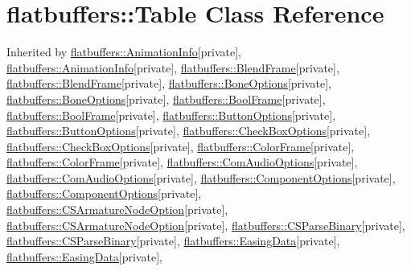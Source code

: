 \hypertarget{classflatbuffers_1_1Table}{}\section{flatbuffers\+:\+:Table Class Reference}
\label{classflatbuffers_1_1Table}


Inherited by \hyperlink{structflatbuffers_1_1AnimationInfo}{flatbuffers\+::\+Animation\+Info}{\ttfamily  \mbox{[}private\mbox{]}}, \hyperlink{structflatbuffers_1_1AnimationInfo}{flatbuffers\+::\+Animation\+Info}{\ttfamily  \mbox{[}private\mbox{]}}, \hyperlink{structflatbuffers_1_1BlendFrame}{flatbuffers\+::\+Blend\+Frame}{\ttfamily  \mbox{[}private\mbox{]}}, \hyperlink{structflatbuffers_1_1BlendFrame}{flatbuffers\+::\+Blend\+Frame}{\ttfamily  \mbox{[}private\mbox{]}}, \hyperlink{structflatbuffers_1_1BoneOptions}{flatbuffers\+::\+Bone\+Options}{\ttfamily  \mbox{[}private\mbox{]}}, \hyperlink{structflatbuffers_1_1BoneOptions}{flatbuffers\+::\+Bone\+Options}{\ttfamily  \mbox{[}private\mbox{]}}, \hyperlink{structflatbuffers_1_1BoolFrame}{flatbuffers\+::\+Bool\+Frame}{\ttfamily  \mbox{[}private\mbox{]}}, \hyperlink{structflatbuffers_1_1BoolFrame}{flatbuffers\+::\+Bool\+Frame}{\ttfamily  \mbox{[}private\mbox{]}}, \hyperlink{structflatbuffers_1_1ButtonOptions}{flatbuffers\+::\+Button\+Options}{\ttfamily  \mbox{[}private\mbox{]}}, \hyperlink{structflatbuffers_1_1ButtonOptions}{flatbuffers\+::\+Button\+Options}{\ttfamily  \mbox{[}private\mbox{]}}, \hyperlink{structflatbuffers_1_1CheckBoxOptions}{flatbuffers\+::\+Check\+Box\+Options}{\ttfamily  \mbox{[}private\mbox{]}}, \hyperlink{structflatbuffers_1_1CheckBoxOptions}{flatbuffers\+::\+Check\+Box\+Options}{\ttfamily  \mbox{[}private\mbox{]}}, \hyperlink{structflatbuffers_1_1ColorFrame}{flatbuffers\+::\+Color\+Frame}{\ttfamily  \mbox{[}private\mbox{]}}, \hyperlink{structflatbuffers_1_1ColorFrame}{flatbuffers\+::\+Color\+Frame}{\ttfamily  \mbox{[}private\mbox{]}}, \hyperlink{structflatbuffers_1_1ComAudioOptions}{flatbuffers\+::\+Com\+Audio\+Options}{\ttfamily  \mbox{[}private\mbox{]}}, \hyperlink{structflatbuffers_1_1ComAudioOptions}{flatbuffers\+::\+Com\+Audio\+Options}{\ttfamily  \mbox{[}private\mbox{]}}, \hyperlink{structflatbuffers_1_1ComponentOptions}{flatbuffers\+::\+Component\+Options}{\ttfamily  \mbox{[}private\mbox{]}}, \hyperlink{structflatbuffers_1_1ComponentOptions}{flatbuffers\+::\+Component\+Options}{\ttfamily  \mbox{[}private\mbox{]}}, \hyperlink{structflatbuffers_1_1CSArmatureNodeOption}{flatbuffers\+::\+C\+S\+Armature\+Node\+Option}{\ttfamily  \mbox{[}private\mbox{]}}, \hyperlink{structflatbuffers_1_1CSArmatureNodeOption}{flatbuffers\+::\+C\+S\+Armature\+Node\+Option}{\ttfamily  \mbox{[}private\mbox{]}}, \hyperlink{structflatbuffers_1_1CSParseBinary}{flatbuffers\+::\+C\+S\+Parse\+Binary}{\ttfamily  \mbox{[}private\mbox{]}}, \hyperlink{structflatbuffers_1_1CSParseBinary}{flatbuffers\+::\+C\+S\+Parse\+Binary}{\ttfamily  \mbox{[}private\mbox{]}}, \hyperlink{structflatbuffers_1_1EasingData}{flatbuffers\+::\+Easing\+Data}{\ttfamily  \mbox{[}private\mbox{]}}, \hyperlink{structflatbuffers_1_1EasingData}{flatbuffers\+::\+Easing\+Data}{\ttfamily  \mbox{[}private\mbox{]}}, 